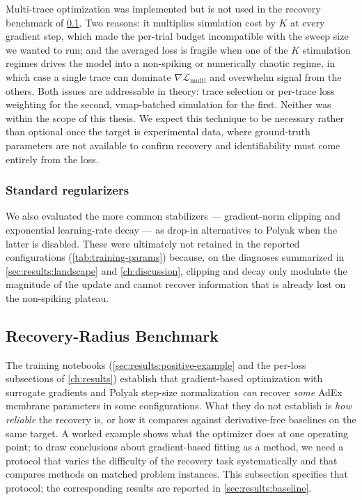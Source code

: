 Multi-trace optimization was implemented but is not used in the recovery benchmark of \cref{sec:method:opt:recovery-benchmark}.
Two reasons: it multiplies simulation cost by $K$ at every gradient step, which made the per-trial budget incompatible with the sweep size we wanted to run;
and the averaged loss is fragile when one of the $K$ stimulation regimes drives the model into a non-spiking or numerically chaotic regime,
in which case a single trace can dominate $\nabla\mathcal{L}_{\mathrm{multi}}$ and overwhelm signal from the others.
Both issues are addressable in theory: trace selection or per-trace loss weighting for the second, vmap-batched simulation for the first.
Neither was within the scope of this thesis.
We expect this technique to be necessary rather than optional once the target is experimental data,
where ground-truth parameters are not available to confirm recovery and identifiability must come entirely from the loss.

\subsubsection{Standard regularizers}\label{sec:method:opt:stabilization:misc}
We also evaluated the more common stabilizers --- gradient-norm clipping and exponential learning-rate decay ---
as drop-in alternatives to Polyak when the latter is disabled.
These were ultimately not retained in the reported configurations (\cref{tab:training-params})
because, on the diagnoses summarized in \cref{sec:results:landscape} and \cref{ch:discussion},
clipping and decay only modulate the magnitude of the update and cannot recover information that is already lost on the non-spiking plateau.

\subsection{Recovery-Radius Benchmark}\label{sec:method:opt:recovery-benchmark}
The training notebooks (\cref{sec:results:positive-example} and the per-loss subsections of \cref{ch:results}) establish that
gradient-based optimization with surrogate gradients and Polyak step-size normalization \emph{can} recover \emph{some} \gls{AdEx} membrane parameters in some configurations.
What they do not establish is \emph{how reliable} the recovery is, or how it compares against derivative-free baselines on the same target.
A worked example shows what the optimizer does at one operating point;
to draw conclusions about gradient-based fitting as a method, we need a protocol that varies the difficulty of the recovery task systematically
and that compares methods on matched problem instances.
This subsection specifies that protocol; the corresponding results are reported in \cref{sec:results:baseline}.

